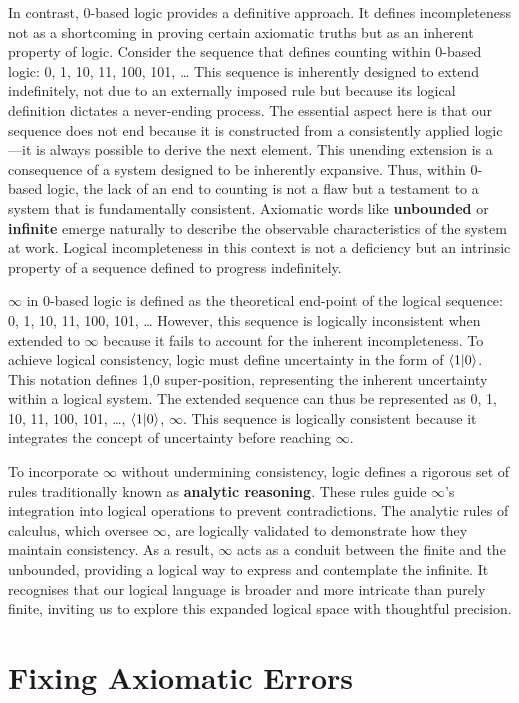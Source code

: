 \documentclass{article}
\begin{document}
In contrast, 0-based logic provides a definitive approach. It defines incompleteness not as a shortcoming in proving certain axiomatic truths but as an inherent property of logic. Consider the sequence that defines counting within 0-based logic: 0, 1, 10, 11, 100, 101, … This sequence is inherently designed to extend indefinitely, not due to an externally imposed rule but because its logical definition dictates a never-ending process. The essential aspect here is that our sequence does not end because it is constructed from a consistently applied logic—it is always possible to derive the next element. This unending extension is a consequence of a system designed to be inherently expansive. Thus, within 0-based logic, the lack of an end to counting is not a flaw but a testament to a system that is fundamentally consistent. Axiomatic words like \textbf{unbounded} or \textbf{infinite} emerge naturally to describe the observable characteristics of the system at work. Logical incompleteness in this context is not a deficiency but an intrinsic property of a sequence defined to progress indefinitely.

$\infty$ in 0-based logic is defined as the theoretical end-point of the logical sequence: 0, 1, 10, 11, 100, 101, … However, this sequence is logically inconsistent when extended to $\infty$ because it fails to account for the inherent incompleteness. To achieve logical consistency, logic must define uncertainty in the form of $\langle 1 | 0 \rangle$. This notation defines 1,0 super-position, representing the inherent uncertainty within a logical system. The extended sequence can thus be represented as 0, 1, 10, 11, 100, 101, …, $\langle 1 | 0 \rangle$, $\infty$. This sequence is logically consistent because it integrates the concept of uncertainty before reaching $\infty$.

To incorporate $\infty$ without undermining consistency, logic defines a rigorous set of rules traditionally known as \textbf{analytic reasoning}. These rules guide $\infty$'s integration into logical operations to prevent contradictions. The analytic rules of calculus, which oversee $\infty$, are logically validated to demonstrate how they maintain consistency. As a result, $\infty$ acts as a conduit between the finite and the unbounded, providing a logical way to express and contemplate the infinite. It recognises that our logical language is broader and more intricate than purely finite, inviting us to explore this expanded logical space with thoughtful precision.

\section*{Fixing Axiomatic Errors}
\end{document}
